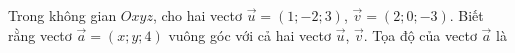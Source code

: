 \begin{ex}
Trong không gian $Oxyz$, cho hai vectơ $\vec u=(1;-2;3)$, $\vec v=(2;0;-3)$. Biết rằng vectơ $\vec a=(x;y;4)$ vuông góc với cả hai vectơ $\vec u$, $\vec v$. Tọa độ của vectơ $\vec a$ là
\end{ex}
